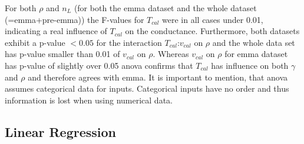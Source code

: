 For both $\rho$ and $n_L$ (for both the \gls{emma} dataset and the whole dataset (=\gls{emma}+pre-\gls{emma})) 
the F-values for $T_{cal}$ were in all cases under 0.01, 
indicating a real influence of $T_{cal}$ on the conductance.
Furthermore, both datasets exhibit a p-value $< 0.05$ for the interaction $T_{cal}$:$v_{cal}$ on $\rho$
and the whole data set has p-value smaller than 0.01 of $v_{cal}$ on $\rho$. 
Whereas $v_{cal}$ on $\rho$ for \gls{emma} dataset has p-value of slightly over 0.05
%
\Gls{anova} confirms that $T_{cal}$ has influence on both $\gamma$ and $\rho$ 
and therefore agrees with \gls{emma}.
It is important to mention, that \gls{anova} assumes categorical data for inputs. 
Categorical inputs have no order and thus information is lost when using numerical data. 


\subsection{Linear Regression} 

